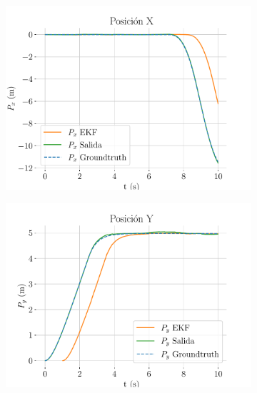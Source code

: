 \begin{figure}	
	\centering
	\hspace*{-0.5cm}
	\begin{subfigure}[t]{0.49\textwidth}
		\centering
		\includegraphics[width=\textwidth]{estimador_px4/im_simu/handle_delay/x_t}
		\caption{}
	\end{subfigure}
	\quad
	\begin{subfigure}[t]{0.49\textwidth}
		\centering
		\includegraphics[width=\textwidth]{estimador_px4/im_simu/handle_delay/y_t}
		\caption{}
	\end{subfigure}
	\quad
	\hspace*{-0.5cm}
	\begin{subfigure}[t]{0.49\textwidth}

\end{subfigure}
\end{figure}
